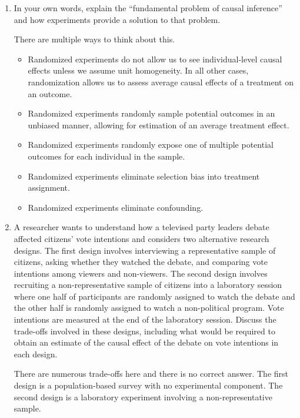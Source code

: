 \documentclass[a4paper]{exam}
\begin{document}
\begin{enumerate}
\item  In your own words, explain the ``fundamental problem of causal inference'' and how experiments provide a solution to that problem.

\begin{solution}

There are multiple ways to think about this.

\begin{itemize}
\item Randomized experiments do not allow us to see individual-level causal effects unless we assume unit homogeneity. In all other cases, randomization allows us to assess average causal effects of a treatment on an outcome.
\item Randomized experiments randomly sample potential outcomes in an unbiased manner, allowing for estimation of an average treatment effect.
\item Randomized experiments randomly expose one of multiple potential outcomes for each individual in the sample.
\item Randomized experiments eliminate selection bias into treatment assignment.
\item Randomized experiments eliminate confounding.
\end{itemize}

\end{solution}

\item A researcher wants to understand how a televised party leaders debate affected citizens' vote intentions and considers two alternative research designs. The first design involves interviewing a representative sample of citizens, asking whether they watched the debate, and comparing vote intentions among viewers and non-viewers. The second design involves recruiting a non-representative sample of citizens into a laboratory session where one half of participants are randomly assigned to watch the debate and the other half is randomly assigned to watch a non-political program. Vote intentions are measured at the end of the laboratory session. Discuss the trade-offs involved in these designs, including what would be required to obtain an estimate of the causal effect of the debate on vote intentions in each design.

\begin{solution}

There are numerous trade-offs here and there is no correct answer. The first design is a population-based survey with no experimental component. The second design is a laboratory experiment involving a non-representative sample.


\end{solution}
\end{enumerate}
\end{document}

